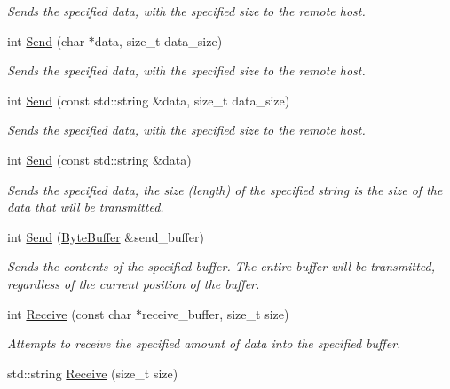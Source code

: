 \begin{DoxyCompactItemize}
\begin{DoxyCompactList}\small\item\em Sends the specified data, with the specified size to the remote host. \end{DoxyCompactList}\item 
int \hyperlink{class_senergy_1_1_socket_a71531342844744a24298fecc25497671}{Send} (char $\ast$data, size\-\_\-t data\-\_\-size)
\begin{DoxyCompactList}\small\item\em Sends the specified data, with the specified size to the remote host. \end{DoxyCompactList}\item 
int \hyperlink{class_senergy_1_1_socket_a9ca07e0de8c6f74f27963f17c8b1398d}{Send} (const std\-::string \&data, size\-\_\-t data\-\_\-size)
\begin{DoxyCompactList}\small\item\em Sends the specified data, with the specified size to the remote host. \end{DoxyCompactList}\item 
int \hyperlink{class_senergy_1_1_socket_a72e1de4e0e3ef63bb020c62bea989fa6}{Send} (const std\-::string \&data)
\begin{DoxyCompactList}\small\item\em Sends the specified data, the size (length) of the specified string is the size of the data that will be transmitted. \end{DoxyCompactList}\item 
int \hyperlink{class_senergy_1_1_socket_a14fe1f1cc811d3f8bb437c4158840928}{Send} (\hyperlink{class_senergy_1_1_byte_buffer}{Byte\-Buffer} \&send\-\_\-buffer)
\begin{DoxyCompactList}\small\item\em Sends the contents of the specified buffer. The entire buffer will be transmitted, regardless of the current position of the buffer. \end{DoxyCompactList}\item 
int \hyperlink{class_senergy_1_1_socket_a7045f756d3c542ee1187a92ca13fa232}{Receive} (const char $\ast$receive\-\_\-buffer, size\-\_\-t size)
\begin{DoxyCompactList}\small\item\em Attempts to receive the specified amount of data into the specified buffer. \end{DoxyCompactList}\item 
std\-::string \hyperlink{class_senergy_1_1_socket_a0c1510be39bef49de15e8647b64dbb5e}{Receive} (size\-\_\-t size)

\end{DoxyCompactItemize}

